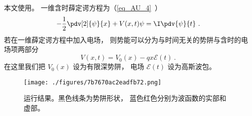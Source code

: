 
\begin{issues}
\issueDraft
\end{issues}


本文使用。 一维含时薛定谔方程为（\autoref{eq_AU_4}~）
\begin{equation}
-\frac12 \pdv[2]{\psi}{x} + V(x,t)\psi = \I \pdv{\psi}{t}~.
\end{equation}
若在一维薛定谔方程中加入电场， 则势能可以分为与时间无关的势阱与含时的电场项两部分%
\begin{equation}
V(x,t) = V_0(x) - qx\mathcal E(t)~.
\end{equation}
在这里我们把 $V_0(x)$ 设为有限深势阱， 电场 $\mathcal E(t)$ 设为高斯波包。

\begin{figure}[ht]
\centering
\texttt{[image: ./figures/7b7670ac2eadfb72.png]}
\caption{运行结果。黑色线条为势阱形状， 蓝色红色分别为波函数的实部和虚部。} \label{fig_FSWpi_1}
\end{figure}

